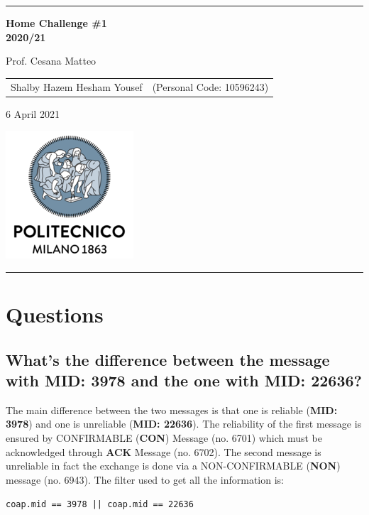 \documentclass{article}
\begin{document}
\setlength\parindent{0pt} %
\setlength\parskip{1em}

\begin{titlepage}
	\centering
	\hrule
	
	\vspace{6,5cm}
	{\Huge \textbf{Home Challenge \#1\\
		2020/21}\\}
		
		\vspace{0,5cm}
		\large {Prof. Cesana Matteo}
		
		\vspace{2,5cm}
		{
			\large
			\begin{tabular}{c c}
				Shalby Hazem Hesham Yousef & (Personal Code: 10596243) \\
			\end{tabular}
			
		}
		\vspace{4cm}
		
		\normalsize{6 April 2021}
		\vspace{0,2cm}
		
		\centering\hspace{0,2cm}\includegraphics[scale=0.6]{./logo.png}
		\vspace{0,5cm}
		\hrule
		
		\end{titlepage}
		
		\pagebreak
		
		
		
		\pagebreak
		
		\section{Questions} %
		
		\subsection{What’s the difference between the message with MID: 3978 and the one with MID: 22636?} %
		The main difference between the two messages is that one is reliable (\textbf{MID: 3978}) and one is unreliable (\textbf{MID: 22636}). The reliability of the first message is ensured by CONFIRMABLE (\textbf{CON}) Message (no. 6701) which must be acknowledged through \textbf{ACK} Message (no. 6702). The second message is unreliable in fact the exchange is done via a NON-CONFIRMABLE (\textbf{NON}) message (no. 6943). The filter used to get all the information is:
		\begin{center}
			\texttt{coap.mid == 3978 || coap.mid == 22636}
		\end{center}
		
\end{document}
